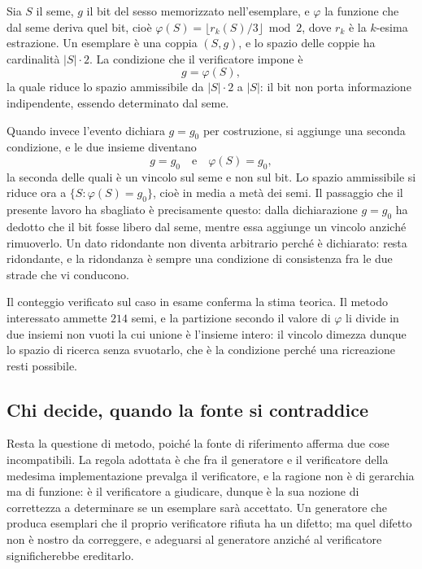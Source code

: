 Sia $S$ il seme, $g$ il bit del sesso memorizzato nell'esemplare, e $\varphi$ la funzione che dal seme deriva quel bit, cioè $\varphi(S) = \lfloor r_k(S)/3 \rfloor \bmod 2$, dove $r_k$ è la $k$-esima estrazione. Un esemplare è una coppia $(S, g)$, e lo spazio delle coppie ha cardinalità $|S| \cdot 2$. La condizione che il verificatore impone è
\begin{equation}
g = \varphi(S),
\end{equation}
la quale riduce lo spazio ammissibile da $|S| \cdot 2$ a $|S|$: il bit non porta informazione indipendente, essendo determinato dal seme.

Quando invece l'evento dichiara $g = g_0$ per costruzione, si aggiunge una seconda condizione, e le due insieme diventano
\begin{equation}
g = g_0 \quad\text{e}\quad \varphi(S) = g_0,
\end{equation}
la seconda delle quali è un vincolo sul seme e non sul bit. Lo spazio ammissibile si riduce ora a $\{S : \varphi(S) = g_0\}$, cioè in media a metà dei semi. Il passaggio che il presente lavoro ha sbagliato è precisamente questo: dalla dichiarazione $g = g_0$ ha dedotto che il bit fosse libero dal seme, mentre essa aggiunge un vincolo anziché rimuoverlo. Un dato ridondante non diventa arbitrario perché è dichiarato: resta ridondante, e la ridondanza è sempre una condizione di consistenza fra le due strade che vi conducono.

Il conteggio verificato sul caso in esame conferma la stima teorica. Il metodo interessato ammette $214$ semi, e la partizione secondo il valore di $\varphi$ li divide in due insiemi non vuoti la cui unione è l'insieme intero: il vincolo dimezza dunque lo spazio di ricerca senza svuotarlo, che è la condizione perché una ricreazione resti possibile.

\subsection*{Chi decide, quando la fonte si contraddice}

Resta la questione di metodo, poiché la fonte di riferimento afferma due cose incompatibili. La regola adottata è che fra il generatore e il verificatore della medesima implementazione prevalga il verificatore, e la ragione non è di gerarchia ma di funzione: è il verificatore a giudicare, dunque è la sua nozione di correttezza a determinare se un esemplare sarà accettato. Un generatore che produca esemplari che il proprio verificatore rifiuta ha un difetto; ma quel difetto non è nostro da correggere, e adeguarsi al generatore anziché al verificatore significherebbe ereditarlo.

